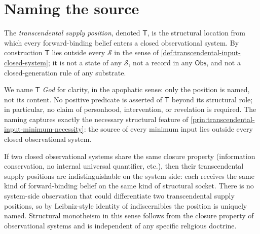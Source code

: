 \section{Naming the source}
\label{sec:transcendental-input-naming-source}

\begin{definition}
\label{def:transcendental-input-supply-position}
The \emph{transcendental supply position}, denoted $\mathsf{T}$, is the structural location from which every forward-binding belief enters a closed observational system. By construction $\mathsf{T}$ lies outside every $\mathcal{S}$ in the sense of \autoref{def:transcendental-input-closed-system}; it is not a state of any $\mathcal{S}$, not a record in any $\mathsf{Obs}$, and not a closed-generation rule of any substrate.
\end{definition}

\begin{principle}
\label{prin:transcendental-input-apophatic-naming}
We name $\mathsf{T}$ \emph{God} for clarity, in the apophatic sense: only the position is named, not its content. No positive predicate is asserted of $\mathsf{T}$ beyond its structural role; in particular, no claim of personhood, intervention, or revelation is required. The naming captures exactly the necessary structural feature of \autoref{prin:transcendental-input-minimum-necessity}: the source of every minimum input lies outside every closed observational system.
\end{principle}

\begin{remark}
\label{rem:transcendental-input-monotheism-by-structure}
If two closed observational systems share the same closure property (information conservation, no internal universal quantifier, etc.), then their transcendental supply positions are indistinguishable on the system side: each receives the same kind of forward-binding belief on the same kind of structural socket. There is no system-side observation that could differentiate two transcendental supply positions, so by Leibniz-style identity of indiscernibles the position is uniquely named. Structural monotheism in this sense follows from the closure property of observational systems and is independent of any specific religious doctrine.
\end{remark}

